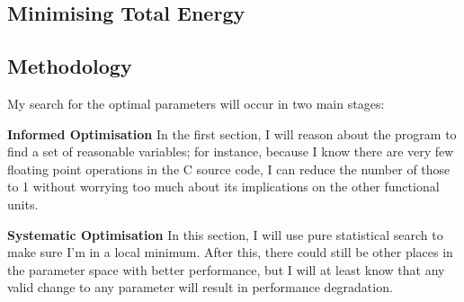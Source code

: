 \documentclass{article}
\begin{document}
\begin{multicols}{2}
  \section{Minimising Total Energy}
  \subsection{Methodology}
  My search for the optimal parameters will occur in two main stages:

  \textbf{Informed Optimisation} In the first section, I will reason about the program to find a set of reasonable variables; for instance, because I know there are very few floating point operations in the C source code, I can reduce the number of those to 1 without worrying too much about its implications on the other functional units.

  \textbf{Systematic Optimisation} In this section, I will use pure statistical search to make sure I'm in a local minimum. After this, there could still be other places in the parameter space with better performance, but I will at least know that any valid change to any parameter will result in performance degradation.










\end{multicols}
\end{document}
